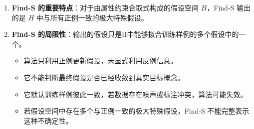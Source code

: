 \documentclass[../main.tex]{subfiles}
\begin{document}
\begin{enumerate}
    \item \textbf{Find-S 的重要特点}：对于由属性约束合取式构成的假设空间 $H$，Find-S 输出的是 $H$ 中与所有正例一致的极大特殊假设。

    \item \textbf{Find-S 的局限性}：输出的假设只是H中能够拟合训练样例的多个假设中的一个。
    {\small\kaishu
    \begin{itemize}
        \item 算法只利用正例更新假设，未显式利用反例信息。
        \item 它不能判断最终假设是否已经收敛到真实目标概念。
        \item 它默认训练样例彼此一致，若数据存在噪声或标注冲突，算法可能失效。
        \item 若假设空间中存在多个与正例一致的极大特殊假设，Find-S 不能完整表示这种不确定性。
    \end{itemize}
    }
\end{enumerate}
\end{document}
